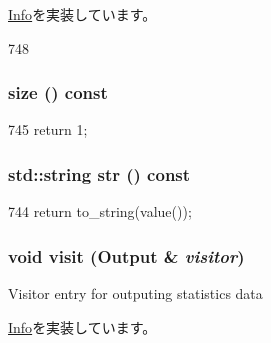 \hyperlink{classStats_1_1Info_a20dcbdfbd0ec77afc802522bb7e379c1}{Info}を実装しています。


\begin{DoxyCode}
748 { }
\end{DoxyCode}
\hypertarget{classStats_1_1ProxyInfo_a503ab01f6c0142145d3434f6924714e7}{
\subsubsection[{size}]{ size () const}}
\label{classStats_1_1ProxyInfo_a503ab01f6c0142145d3434f6924714e7}



\begin{DoxyCode}
745 { return 1; }
\end{DoxyCode}
\hypertarget{classStats_1_1ProxyInfo_a1b9b8885b0880fc4ddf9a2c7d1ca3dc4}{
\subsubsection[{str}]{\setlength{\rightskip}{0pt plus 5cm}std::string str () const}}
\label{classStats_1_1ProxyInfo_a1b9b8885b0880fc4ddf9a2c7d1ca3dc4}



\begin{DoxyCode}
744 { return to_string(value()); }
\end{DoxyCode}
\hypertarget{classStats_1_1ProxyInfo_adb3e1761782ea843b4400aeeaa6c4887}{
\subsubsection[{visit}]{\setlength{\rightskip}{0pt plus 5cm}void visit ({\bf Output} \& {\em visitor})}}
\label{classStats_1_1ProxyInfo_adb3e1761782ea843b4400aeeaa6c4887}
Visitor entry for outputing statistics data 

\hyperlink{classStats_1_1Info_a98d7011c51fa7058e7812bafc913f69a}{Info}を実装しています。


